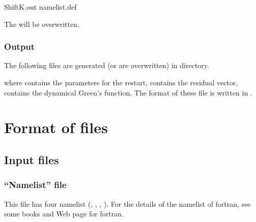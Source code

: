 \documentclass[letterpaper,10pt,dvipdfmx,openany,english]{sphinxmanual}
\begin{document}
\begin{sphinxVerbatim}[commandchars=\\\{\}]
\PYGZdl{} ShiftK.out namelist.def
\end{sphinxVerbatim}

The  will be overwritten.


\subsection{Output}
\label{\detokenize{shiftk_flow_en:id5}}
The following files are generated (or are overwritten) in  directory.

\begin{sphinxVerbatim}[commandchars=\\\{\}]
  
\end{sphinxVerbatim}

where
 contains the parameters for the restart,
 contains the residual vector,
 contains the dynamical Green’s function.
The format of these file is written in
{\hyperref[\detokenize{shiftk_format_en:revec}]{}} \sphinxhyphen{} {\hyperref[\detokenize{shiftk_format_en:dynamicalg}]{}}.


\chapter{Format of files}
\label{\detokenize{shiftk_format_en:format-of-files}}\label{\detokenize{shiftk_format_en:fileformat}}\label{\detokenize{shiftk_format_en::doc}}

\section{Input files}
\label{\detokenize{shiftk_format_en:input-files}}

\subsection{“Namelist” file}
\label{\detokenize{shiftk_format_en:namelist-file}}\label{\detokenize{shiftk_format_en:modpara}}
This file has four namelist (, , , ).
For the details of the namelist of fortran, see some books and Web page for fortran.
\end{document}
